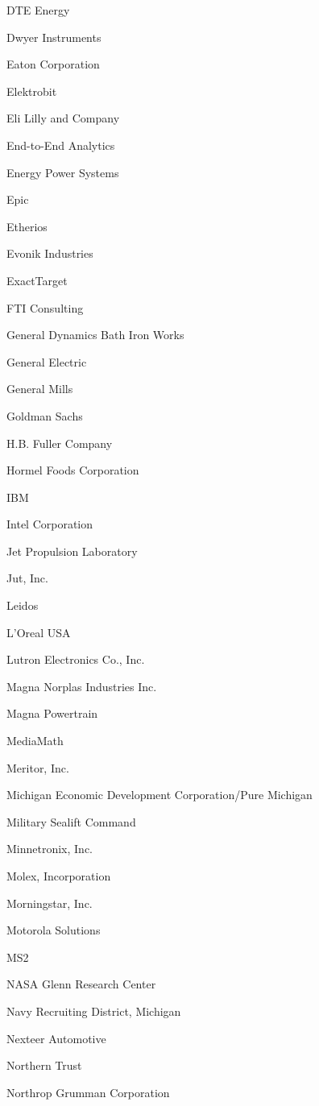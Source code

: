 \documentclass[twoside]{article}
\begin{document}
\begin{center}
\begin{multicols}{5}
\begin{FlushLeft}
\begin{compactitem}
\item DTE Energy
\item Dwyer Instruments
\item Eaton Corporation
\item Elektrobit
\item Eli Lilly and Company
\item End-to-End Analytics
\item Energy Power Systems
\item Epic
\item Etherios
\item Evonik Industries
\item ExactTarget
\item FTI Consulting
\item General Dynamics Bath Iron Works
\item General Electric
\item General Mills
\item Goldman Sachs
\item H.B. Fuller Company
\item Hormel Foods Corporation
\item IBM
\item Intel Corporation
\item Jet Propulsion Laboratory
\item Jut, Inc.
\item Leidos
\item L'Oreal USA
\item Lutron Electronics Co., Inc.
\item Magna Norplas Industries Inc.
\item Magna Powertrain
\item MediaMath
\item Meritor, Inc.
\item Michigan Economic Development Corporation/Pure Michigan
\item Military Sealift Command
\item Minnetronix, Inc.
\item Molex, Incorporation
\item Morningstar, Inc.
\item Motorola Solutions
\item MS2
\item NASA Glenn Research Center
\item Navy Recruiting District, Michigan
\item Nexteer Automotive
\item Northern Trust
\item Northrop Grumman Corporation

\end{compactitem}
\end{FlushLeft}
\end{multicols}
\end{center}
\end{document}
